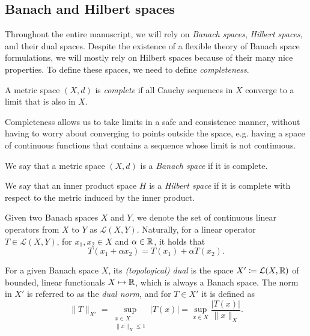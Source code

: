 \subsection{Banach and Hilbert spaces}\label{sec:banach-hilbert-spaces}
Throughout the entire manuscript, we will rely on \emph{Banach spaces}, \emph{Hilbert spaces}, and their dual spaces. Despite the existence of a flexible theory of Banach space formulations, we will mostly rely on Hilbert spaces because of their many nice properties. To define these spaces, we need to define \emph{completeness}.
\begin{definition}[Completeness]
    A metric space $(X,d)$ is \emph{complete} if all Cauchy sequences in $X$ converge to a limit that is also in $X$.
\end{definition}
Completeness allows us to take limits in a safe and consistence manner, without having to worry about converging to points outside the space, e.g. having a space of continuous functions that contains a sequence whose limit is not continuous. 
\begin{definition}\label{def:banach-space}
    We say that a metric space $(X,d)$ is a \emph{Banach space} if it is complete.
\end{definition}
\begin{definition}\label{def:hilbert-space}
    We say that an inner product space $H$ is a \emph{Hilbert space} if it is complete with respect to the metric induced by the inner product.
\end{definition}
\begin{definition}\label{def:linear-operator}
    Given two Banach spaces $X$ and $Y$, we denote the set of continuous linear operators from $X$ to $Y$ as $\mathcal{L}(X,Y)$. Naturally, for a linear operator $T\in \mathcal{L}(X,Y)$, for $x_1,x_2\in X$ and $\alpha\in\mathbb{R}$, it holds that 
    \begin{equation}
        T(x_1+\alpha x_2) = T(x_1) + \alpha T(x_2).
    \end{equation}
\end{definition}
\begin{definition}
    For a given Banach space $X$, its \emph{(topological) dual} is the space $X'\coloneqq \mathcal{L}(X,\mathbb{R})$ of bounded, linear functionals $X\mapsto \mathbb{R}$, which is always a Banach space. The norm in $X'$ is referred to as the \emph{dual norm}, and for $T\in X'$ it is defined as 
    \begin{equation}\label{eq:dual-norm}
        \|T\|_{X'} = \sup_{\substack{x\in X\\ \|x\|_X\leq 1}} |T(x)|= \sup_{x\in X}\frac{|T(x)|}{\|x\|_X}.
    \end{equation}
\end{definition}

